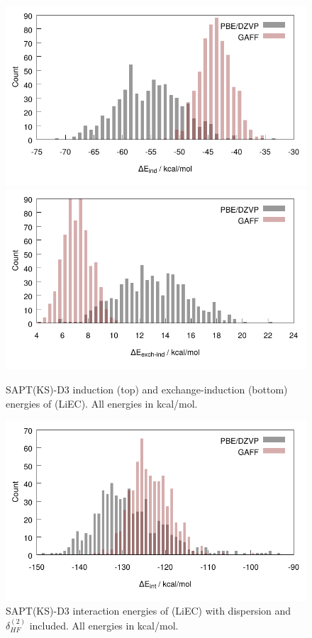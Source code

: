 \begin{figure}
 \begin{center}
 \includegraphics[width=0.9\linewidth]{images/ecpc/liec_ind.pdf} \\
 \includegraphics[width=0.9\linewidth]{images/ecpc/liec_exch-ind.pdf}
 \end{center} 
 \caption[SAPT(KS)-D3 induction and exchange-induction energies of (LiEC)\sur{+}]{\label{fig:ecsapt2}SAPT(KS)-D3 induction (top) and exchange-induction
 (bottom) energies of (LiEC)\sur{+}. All energies in kcal/mol.}
\end{figure}

\begin{figure}
 \begin{center}
 \includegraphics[width=0.9\linewidth]{images/ecpc/liec_int.pdf}
 \end{center} 
 \caption[SAPT(KS)-D3 interaction energies of (LiEC)\sur{+}]{\label{fig:ecsaptint}SAPT(KS)-D3 interaction energies of (LiEC)\sur{+} with dispersion and
 $\delta_{HF}^{(2)}$ included. All energies in kcal/mol.}
\end{figure}

